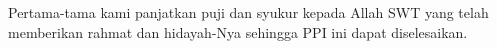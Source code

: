 \begin{acknowledgements}
Pertama-tama kami panjatkan puji dan syukur kepada Allah SWT yang telah memberikan rahmat dan hidayah-Nya sehingga PPI ini dapat diselesaikan.
\end{acknowledgements}